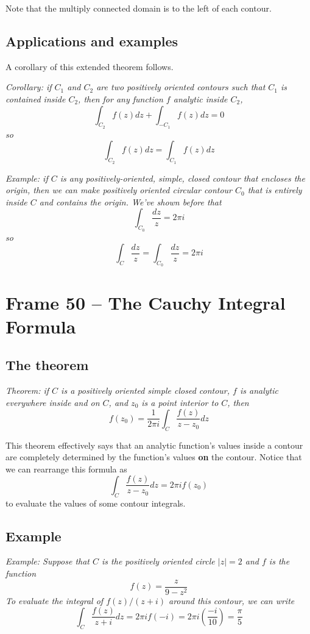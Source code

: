 \documentclass{article}
\renewcommand{\emph}{\textbf}
\begin{document}
Note that the multiply connected domain is to the left of each contour.

\subsection{Applications and examples}
A corollary of this extended theorem follows.

\textit{Corollary: if $C_1$ and $C_2$ are two positively oriented contours such that $C_1$ is contained inside $C_2$, then for any function $f$ analytic inside $C_2$,
\[
	\int_{C_2} f(z) dz + \int_{-C_1} f(z) dz = 0
\]
so
\[
	\int_{C_2} f(z) dz = \int_{C_1} f(z) dz
\]}

\textit{Example: if $C$ is any positively-oriented, simple, closed contour that encloses the origin, then we can make positively oriented circular contour $C_0$ that is entirely inside $C$ and contains the origin. We've shown before that
\[
	\int_{C_0} \frac{dz}{z} = 2\pi i
\]
so
\[
	\int_C \frac{dz}{z} = \int_{C_0} \frac{dz}{z} = 2\pi i
\]}


\clearpage
\section{Frame 50 -- The Cauchy Integral Formula}
\subsection{The theorem}
\textit{Theorem: if $C$ is a positively oriented simple closed contour, $f$ is analytic everywhere inside and on $C$, and $z_0$ is a point interior to $C$, then
\[
	f(z_0) = \frac{1}{2\pi i} \int_C \frac{f(z)}{z - z_0} dz
\]}

This theorem effectively says that an analytic function's values inside a contour are completely determined by the function's values \emph{on} the contour. Notice that we can rearrange this formula as
\[
	\int_C \frac{f(z)}{z - z_0} dz = 2\pi i f(z_0)
\]
to evaluate the values of some contour integrals.

\subsection{Example}
\textit{Example: Suppose that $C$ is the positively oriented circle $|z| = 2$ and $f$ is the function
\[
	f(z) = \frac{z}{9 - z^2}
\]
To evaluate the integral of $f(z) / (z + i)$ around this contour, we can write
\[
	\int_C \frac{f(z)}{z + i} dz
	= 2\pi i f(-i)
	= 2\pi i \left( \frac{-i}{10} \right)
	= \frac{\pi}{5}
\]}
\end{document}
